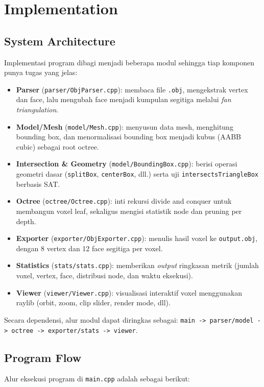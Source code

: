 \documentclass[11pt,a4paper]{article}
\begin{document}
\section{Implementation}\label{sec:impl}
\subsection{System Architecture}
Implementasi program dibagi menjadi beberapa modul sehingga tiap komponen punya tugas yang jelas:

\begin{itemize}
    \item \textbf{Parser} (\texttt{parser/ObjParser.cpp}): membaca file \texttt{.obj},
    mengekstrak vertex dan face, lalu mengubah face menjadi kumpulan segitiga
    melalui \textit{fan triangulation}.
    \item \textbf{Model/Mesh} (\texttt{model/Mesh.cpp}): menyusun data mesh,
    menghitung bounding box, dan menormalisasi bounding box menjadi kubus
    (AABB cubic) sebagai root octree.
    \item \textbf{Intersection \& Geometry} (\texttt{model/BoundingBox.cpp}):
    berisi operasi geometri dasar (\texttt{splitBox}, \texttt{centerBox}, dll.)
    serta uji \texttt{intersectsTriangleBox} berbasis SAT.
    \item \textbf{Octree} (\texttt{octree/Octree.cpp}): inti rekursi
    divide and conquer untuk membangun voxel leaf, sekaligus mengisi statistik
    node dan pruning per depth.
    \item \textbf{Exporter} (\texttt{exporter/ObjExporter.cpp}): menulis hasil voxel
    ke \texttt{output.obj}, dengan 8 vertex dan 12 face segitiga per voxel.
    \item \textbf{Statistics} (\texttt{stats/stats.cpp}): memberikan \textit{output} ringkasan metrik
    (jumlah voxel, vertex, face, distribusi node, dan waktu eksekusi).
    \item \textbf{Viewer} (\texttt{viewer/Viewer.cpp}): visualisasi interaktif voxel
    menggunakan raylib (orbit, zoom, clip slider, render mode, dll).
\end{itemize}

Secara dependensi, alur modul dapat diringkas sebagai:
\texttt{main -> parser/model -> octree -> exporter/stats -> viewer}.

\subsection{Program Flow}
Alur eksekusi program di \texttt{main.cpp} adalah sebagai berikut:
\end{document}
